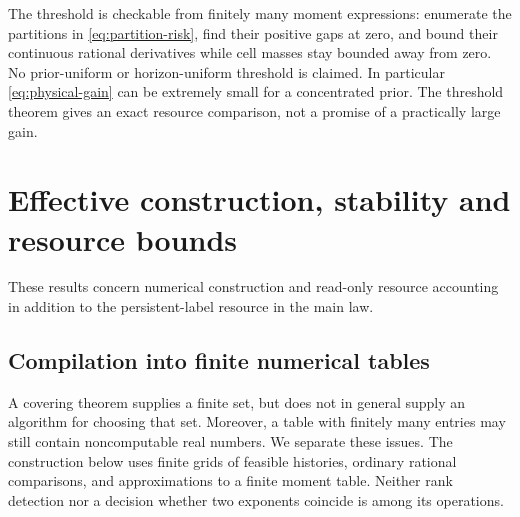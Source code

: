 \documentclass[11pt]{amsart}
\theoremstyle{definition}\newtheorem{definition}[theorem]{Definition}
\theoremstyle{remark}\newtheorem{remark}[theorem]{Remark}
\begin{document}
The threshold is checkable from finitely many moment expressions: enumerate
the partitions in \eqref{eq:partition-risk}, find their positive gaps at
zero, and bound their continuous rational derivatives while cell masses
stay bounded away from zero. No prior-uniform or horizon-uniform threshold
is claimed. In particular \eqref{eq:physical-gain} can be extremely small
for a concentrated prior. The threshold theorem gives an exact resource
comparison, not a promise of a practically large gain.

\endgroup
\section{Effective construction, stability and resource bounds}
\label{app:effective}
These results concern numerical construction and read-only resource
accounting in addition to the persistent-label resource in the main law.
\begingroup
\let\section\subsection
\let\subsection\subsubsection
\let\subsubsection\paragraph
\section{Compilation into finite numerical tables}\label{sec:effective}
A covering theorem supplies a finite set, but does not in general supply
an algorithm for choosing that set. Moreover, a table with finitely many
entries may still contain noncomputable real numbers. We separate these
issues. The construction below uses finite grids of feasible histories,
ordinary rational comparisons, and approximations to a finite moment
table. Neither rank detection nor a decision whether two exponents
coincide is among its operations.
\end{document}
